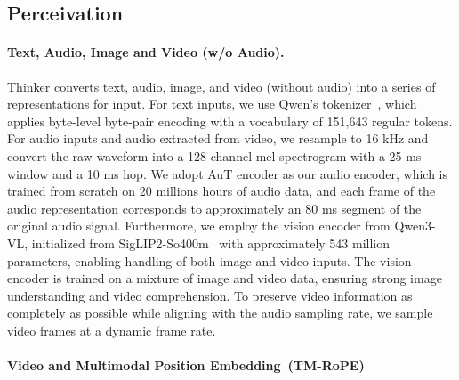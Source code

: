 \subsection{Perceivation}
\paragraph{Text, Audio, Image and Video (w/o Audio).} 

Thinker converts text, audio, image, and video (without audio) into a series of  representations for input. For text inputs, we use Qwen’s tokenizer~\citep{qwen3}, which applies byte-level byte-pair encoding with a vocabulary of 151,643 regular tokens. For audio inputs and audio extracted from video, we resample to 16 kHz and convert the raw waveform into a 128 channel mel-spectrogram with a 25 ms window and a 10 ms hop. We adopt AuT encoder as our audio encoder, which is trained from scratch on 20 millions hours of audio data, and each frame of the audio representation corresponds to approximately an 80 ms segment of the original audio signal. Furthermore, we employ the vision encoder from Qwen3-VL, initialized from SigLIP2-So400m~\citep{siglip2} with approximately 543 million parameters, enabling handling of both image and video inputs. The vision encoder is trained on a mixture of image and video data, ensuring strong image understanding and video comprehension. To preserve video information as completely as possible while aligning with the audio sampling rate, we sample video frames at a dynamic frame rate.

\paragraph{Video and Multimodal Position Embedding~(TM-RoPE)}  

